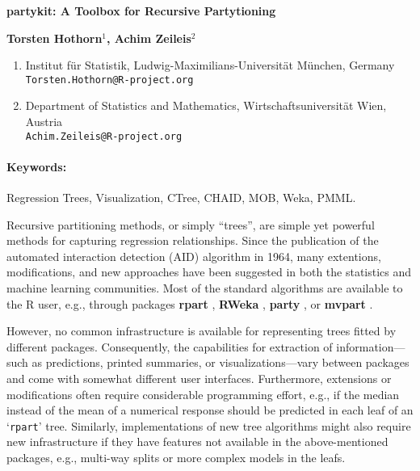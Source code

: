 \documentclass[10pt]{article}
\renewcommand{\title}[1]{\begin{center}{\bf \LARGE #1}\end{center}}
\newcommand{\keywords}{\paragraph{Keywords:}}
\let\code=\texttt
\let\pkg=\textbf
\let\proglang=\textsf
\newcommand{\class}[1]{`\code{#1}'}
\begin{document}
\pagestyle{empty}

\title{\pkg{partykit}: A Toolbox for Recursive Partytioning}

\begin{center}
  {\bf Torsten Hothorn$^{1}$, Achim Zeileis$^{2}$}
\end{center}

\begin{affiliations}
\begin{enumerate}
  \item Institut f\"ur Statistik, Ludwig-Maximilians-Universit\"at M\"unchen, Germany\\
        \texttt{Torsten.Hothorn@R-project.org}
  \item Department of Statistics and Mathematics, Wirtschaftsuniversit\"at Wien, Austria\\
        \texttt{Achim.Zeileis@R-project.org}
\end{enumerate}
\end{affiliations}

\keywords Regression Trees, Visualization, CTree, CHAID, MOB, Weka, PMML.

\vskip 0.8cm

Recursive partitioning methods, or simply ``trees'', are simple yet powerful
methods for capturing regression relationships. Since the publication of the
automated interaction detection (AID) algorithm in 1964, many extentions,
modifications, and new approaches have been suggested in both the statistics
and machine learning communities. Most of the standard algorithms are
available to the \proglang{R} user, e.g., through packages
\pkg{rpart} \citep{partykit:rpart},
\pkg{RWeka} \citep{partykit:RWeka},
\pkg{party} \citep{partykit:party}, or
\pkg{mvpart} \citep{partykit:mvpart}.

However, no common infrastructure is available for representing trees
fitted by different packages. Consequently, the capabilities for extraction of
information---such as predictions, printed summaries, or visualizations---vary
between packages and come with somewhat different user interfaces.
Furthermore, extensions or modifications often require considerable
programming effort, e.g., if the median instead of the mean of a numerical
response should be predicted in each leaf of an \class{rpart} tree.
Similarly, implementations of new tree algorithms might also require new
infrastructure if they have features not available in the above-mentioned
packages, e.g., multi-way splits or more complex models in the leafs.
\end{document}
